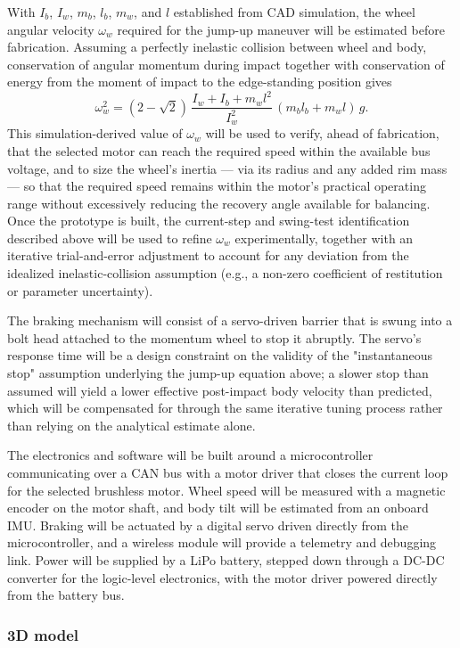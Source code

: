 With $I_b$, $I_w$, $m_b$, $l_b$, $m_w$, and $l$ established from CAD simulation, the wheel angular velocity $\omega_w$ required for the jump-up maneuver will be estimated before fabrication. Assuming a perfectly inelastic collision between wheel and body, conservation of angular momentum during impact together with conservation of energy from the moment of impact to the edge-standing position gives
\begin{equation}
\omega_w^2 = (2-\sqrt2)\,\frac{I_w+I_b+m_wl^2}{I_w^2}\,(m_bl_b+m_wl)\,g.
\end{equation}
This simulation-derived value of $\omega_w$ will be used to verify, ahead of fabrication, that the selected motor can reach the required speed within the available bus voltage, and to size the wheel's inertia — via its radius and any added rim mass — so that the required speed remains within the motor's practical operating range without excessively reducing the recovery angle available for balancing. Once the prototype is built, the current-step and swing-test identification described above will be used to refine $\omega_w$ experimentally, together with an iterative trial-and-error adjustment to account for any deviation from the idealized inelastic-collision assumption (e.g., a non-zero coefficient of restitution or parameter uncertainty).

The braking mechanism will consist of a servo-driven barrier that is swung into a bolt head attached to the momentum wheel to stop it abruptly. The servo's response time will be a design constraint on the validity of the "instantaneous stop" assumption underlying the jump-up equation above; a slower stop than assumed will yield a lower effective post-impact body velocity than predicted, which will be compensated for through the same iterative tuning process rather than relying on the analytical estimate alone.

The electronics and software will be built around a microcontroller communicating over a CAN bus with a motor driver that closes the current loop for the selected brushless motor. Wheel speed will be measured with a magnetic encoder on the motor shaft, and body tilt will be estimated from an onboard IMU. Braking will be actuated by a digital servo driven directly from the microcontroller, and a wireless module will provide a telemetry and debugging link. Power will be supplied by a LiPo battery, stepped down through a DC-DC converter for the logic-level electronics, with the motor driver powered directly from the battery bus.
\subsubsection{3D model}



